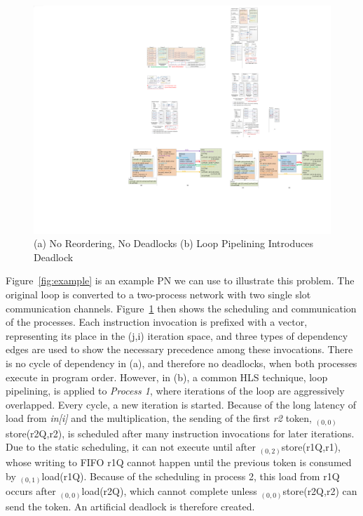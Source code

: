 \documentclass{sig-alternate}
\begin{document}
\begin{figure}[htp]
\begin{center}
\includegraphics[width=1.0\linewidth]{fig/twoSchedules.pdf}
\caption{(a) No Reordering, No Deadlocks (b) Loop Pipelining Introduces Deadlock
\label{fig:2schedules}}
\end{center}
\vspace{-2.0em}
\end{figure}

Figure~\ref{fig:example} is an example PN we can use to illustrate this problem. The original loop is converted to a two-process network
with two single slot communication channels.
Figure~\ref{fig:2schedules} then shows the scheduling and communication of the processes. Each instruction invocation is prefixed with a vector, representing its place in the (j,i) iteration space, and three types of dependency edges are used
to show the necessary precedence among these invocations. There is no cycle of
dependency in (a), and therefore no deadlocks, when both processes execute in program order. However, in (b), 
a common HLS technique, loop pipelining, is applied to \textit{Process 1}, where
iterations of the loop are aggressively overlapped. Every cycle, a new iteration is started. Because of the long latency of load from \textit{in[i]} and
the multiplication, the sending of the first \textit{r2} token, $_{(0,0)}$store(r2Q,r2), is scheduled
after many instruction invocations for later iterations. Due to the static scheduling, it can not execute until after $_{(0,2)}$store(r1Q,r1), whose
writing to FIFO r1Q cannot happen until the previous token is consumed by 
$_{(0,1)}$load(r1Q). Because of the scheduling in process 2, this load from r1Q
occurs after $_{(0,0)}$load(r2Q), which cannot complete unless $_{(0,0)}$store(r2Q,r2)
can send the token.  An artificial deadlock is therefore created. 
\end{document}
